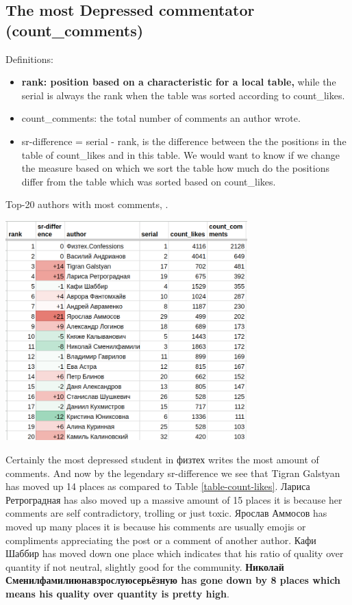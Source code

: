 \documentclass[
	12pt
] {article}
\begin{document}
\subsection{The most Depressed commentator (count\_comments)}
	Definitions:
	\begin{itemize}
		\item \textbf{rank: position based on a characteristic for a local table,} while the serial is always the rank when the table was sorted according to count\_likes.
		\item count\_comments: the total number of comments an author wrote.
		\item sr-difference = serial - rank, is the difference between the the positions in the table of count\_likes and in this table. We would want to know if we change the measure based on which we sort the table how much do the positions differ from the table which was sorted based on count\_likes.
	\end{itemize}

	\begin{table}[H]
		\centering
		\caption{Top-20 authors with most comments, \cite{sheet-count-comments}.}
		\label{table-count-comments}
		\includegraphics[width=0.7\textwidth]{table-count-comments-818}
	\end{table}

	Certainly the most depressed student in физтех writes the most amount of comments. And now by the legendary sr-difference we see that Tigran Galstyan has moved up 14 places as compared to Table \ref{table-count-likes}. Лариса Ретроградная has also moved up a massive amount of 15 places it is because her comments are self contradictory, trolling or just toxic. Ярослав Аммосов has moved up many places it is because his comments are usually emojis or compliments appreciating the post or a comment of another author. Кафи Шаббир has moved down one place which indicates that his ratio of quality over quantity if not neutral, slightly good for the community. \textbf{Николай Сменилфамилиюнавзрослуюсерьёзную has gone down by 8 places which means his quality over quantity is pretty high}.
\end{document}
